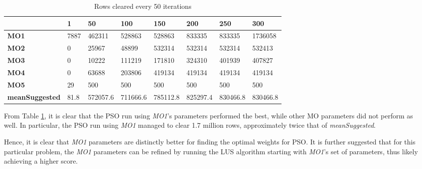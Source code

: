\documentclass[12pt]{article}
\numberwithin{table}{section}
\numberwithin{figure}{section}
\begin{document}
\begin{table}[H]
\small
\centering
\caption{Rows cleared every 50 iterations}
\label{tab:compareParameters}
\begin{tabular}{|l|l|l|l|l|l|l|l|}
\hline
\textbf{}              & \textbf{1} & \textbf{50} & \textbf{100} & \textbf{150} & \textbf{200} & \textbf{250} & \textbf{300} \\ \hline
\textbf{MO1}           & 7887       & 462311      & 528863       & 528863       & 833335       & 833335       & 1736058      \\ \hline
\textbf{MO2}           & 0          & 25967       & 48899        & 532314       & 532314       & 532314       & 532413       \\ \hline
\textbf{MO3}           & 0          & 10222       & 111219       & 171810       & 324310       & 401939       & 407827       \\ \hline
\textbf{MO4}           & 0          & 63688       & 203806       & 419134       & 419134       & 419134       & 419134       \\ \hline
\textbf{MO5}           & 29         & 500         & 500          & 500          & 500          & 500          & 500          \\ \hline
\textbf{meanSuggested} & 81.8       & 572057.6    & 711666.6     & 785112.8     & 825297.4     & 830466.8     & 830466.8     \\ \hline
\end{tabular}
\end{table}


From Table \ref{tab:compareParameters}, it is clear that the PSO run using \emph{MO1}'s parameters performed the best, while other MO parameters did not perform as well. In particular, the PSO run using \emph{MO1} managed to clear 1.7 million rows, approximately twice that of \emph{meanSuggested}.

Hence, it is clear that \emph{MO1} parameters are distinctly better for finding the optimal weights for PSO. It is further suggested that for this particular problem, the \emph{MO1} parameters can be refined by running the LUS algorithm starting with \emph{MO1}'s set of parameters, thus likely achieving a higher score.
\end{document}
